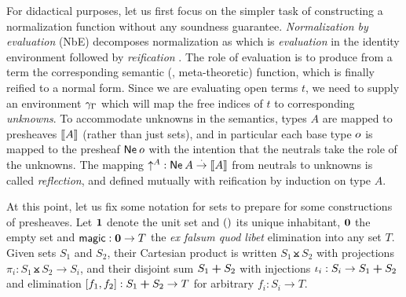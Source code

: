 \documentclass[a4paper,USenglish,cleveref, autoref]{lipics-v2019}
\begin{document}
For didactical purposes, let us first focus on the simpler task of
constructing a normalization function
without any soundness guarantee.
%
\emph{Normalization by evaluation} (NbE) decomposes normalization as
which is
\emph{evaluation}
in the identity environment \nofbox{$\idenv\Gamma : \den \Gamma \Gamma$}
followed by
\emph{reification}
.
The role of evaluation is to produce from a term the corresponding
semantic (\ie, meta-theoretic) function, which is finally reified to a normal form.
Since we are evaluating open terms $t$, we need to supply an environment
$\gamma_{\Gamma}$ which will map the free indices of $t$ to corresponding
\emph{unknowns}.  To accommodate unknowns in the semantics, types $A$
are mapped to presheaves $\mathopen{{[\kern-0.14em[}} A \mathclose{{]\kern-0.14em]}}$ (rather than just sets), and in
particular each base type $o$ is mapped to the presheaf
$\mathsf{Ne}^{}\,o$ with the intention that the neutrals take the role of
the unknowns.  The mapping $\mathord{\uparrow_{}^{A}} : \mathsf{Ne}^{}\,A \stackrel{\cdot}{\to} \mathopen{{[\kern-0.14em[}} A \mathclose{{]\kern-0.14em]}}$ from
neutrals to unknowns is called \emph{reflection}, and defined mutually
with reification by induction on type $A$.

At this point, let us fix some notation for sets to prepare for some
constructions of presheaves.  Let $\mbox{\textbf{1}}$ denote the unit set and
$()$ its unique inhabitant, $\mbox{\textbf{0}}$ the empty set and
$\mathsf{magic} : \mbox{\textbf{0}} \to T$ the \emph{ex falsum quod libet} elimination
into any set $T$.  Given sets $S_1$ and $S_2$, their Cartesian product
is written $S_1 \btimes S_2$ with projections $\pi_i : S_1 \btimes S_2
\to S_i$, and their disjoint sum $S_1 \boldsymbol{+} S_2$ with injections
$\iota_i : S_i \to S_1 \boldsymbol{+} S_2$ and elimination $[f_1,f_2] : S_1 \boldsymbol{+}
S_2 \to T$ for arbitrary $f_i : S_i \to T$.
\end{document}
